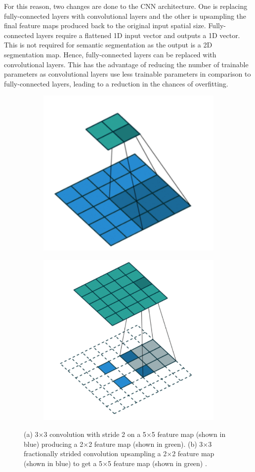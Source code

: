 For this reason, two changes are done to the CNN architecture. One is replacing fully-connected layers with convolutional layers and the other is upsampling the final feature maps produced back to the original input spatial size. Fully-connected layers require a flattened 1D input vector and outputs a 1D vector. This is not required for semantic segmentation as the output is a 2D segmentation map. Hence, fully-connected layers can be replaced with convolutional layers. This has the advantage of reducing the number of trainable parameters as convolutional layers use less trainable parameters in comparison to fully-connected layers, leading to a reduction in the chances of overfitting.

	\begin{figure}[h]
	\centering
		\begin{subfigure}{.45\textwidth}
  			\centering
  			\includegraphics[width=.7\linewidth]{images/reg_conv}
  			\caption{}
  			\label{Fig:tranconva}
		\end{subfigure}
		\begin{subfigure}{.45\textwidth}
  			\centering
  			\includegraphics[width=.7\linewidth]{images/tran_conv}
  			\caption{}
  			\label{Fig:tranconvb}
		\end{subfigure}
		\caption{(a) 3$\times$3 convolution with stride 2 on a 5$\times$5 feature map (shown in blue) producing a 2$\times$2 feature map (shown in green). (b) 3$\times$3 fractionally strided convolution upsampling a 2$\times$2 feature map (shown in blue) to get a 5$\times$5 feature map (shown in green) \cite{diff_conv}.}
		\label{Fig:tranconv}
	\end{figure}

